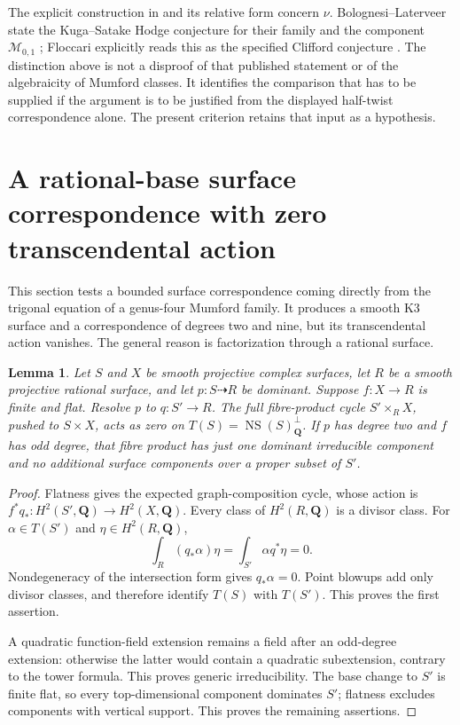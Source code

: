 \documentclass[11pt]{article}
\newtheorem{lemma}[theorem]{Lemma}
\theoremstyle{definition}
\theoremstyle{remark}
\begin{document}
The explicit construction in
\cite[Theorems~5.2, 5.4 and Sections~5.5--5.6]{clifford-vGI}
and its relative form \cite[Theorem~2.8]{clifford-Laterveer} concern $\nu$.
Bolognesi--Laterveer state the Kuga--Satake Hodge conjecture for their
family and the component $\mathcal M_{0,1}$
\cite[Theorem~4.4, Proposition~6.2]{clifford-BL};
Floccari explicitly reads this as the specified Clifford conjecture
\cite[Section~3.3]{clifford-Floccari}.  The distinction above is not a
disproof of that published statement or of the algebraicity of Mumford
classes.  It identifies the comparison that has to be supplied if the
argument is to be justified from the displayed half-twist correspondence
alone.  The present criterion retains that input as a hypothesis.


\section{A rational-base surface correspondence with zero transcendental action}
\label{sec:mumford-fiber-product}

This section tests a bounded surface correspondence coming directly
from the trigonal equation of a genus-four Mumford family.
It produces a smooth K3 surface and a correspondence of degrees
two and nine, but its transcendental action vanishes.
The general reason is factorization through a rational surface.

\begin{lemma}\label{lem:rational-base-fiber-product}
Let $S$ and $X$ be smooth projective complex surfaces, let $R$ be
a smooth projective rational surface, and let $p:S\dashrightarrow R$
be dominant.  Suppose $f:X\to R$ is finite and flat.
Resolve $p$ to $q:S'\to R$.  The full fibre-product cycle
$S'\times_R X$, pushed to $S\times X$, acts as zero on
$T(S)=\operatorname{NS}(S)_{\mathbf Q}^{\perp}$.
If $p$ has degree two and $f$ has odd degree, that fibre product
has just one dominant irreducible component and no additional
surface components over a proper subset of $S'$.
\end{lemma}

\begin{proof}
Flatness gives the expected graph-composition cycle, whose action is
$f^*q_*:H^2(S',\mathbf Q)\to H^2(X,\mathbf Q)$.
Every class of $H^2(R,\mathbf Q)$ is a divisor class.
For $\alpha\in T(S')$ and $\eta\in H^2(R,\mathbf Q)$,
\[
 \int_R(q_*\alpha)\eta=\int_{S'}\alpha q^*\eta=0.
\]
Nondegeneracy of the intersection form gives $q_*\alpha=0$.
Point blowups add only divisor classes, and therefore identify
$T(S)$ with $T(S')$.  This proves the first assertion.

A quadratic function-field extension remains a field after an
odd-degree extension: otherwise the latter would contain a
quadratic subextension, contrary to the tower formula.
This proves generic irreducibility.  The base change to $S'$ is
finite flat, so every top-dimensional component dominates $S'$;
flatness excludes components with vertical support.  This proves
the remaining assertions.
\end{proof}
\end{document}
